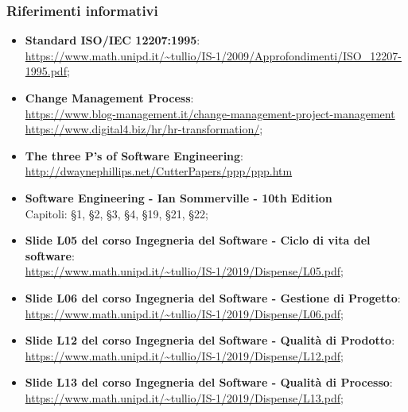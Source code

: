 \subsubsection{Riferimenti informativi}
\begin{itemize}
	\item \textbf{Standard ISO/IEC 12207:1995}: \\
	\url{https://www.math.unipd.it/~tullio/IS-1/2009/Approfondimenti/ISO_12207-1995.pdf};
	\item \textbf{Change Management Process}: \\
	\href{https://www.blog-management.it/2018/04/10/change-management-project-management/}{https://www.blog-management.it/change-management-project-management}\\
	\href{https://www.digital4.biz/hr/hr-transformation/digital-transformation-e-change-management-vanno-avanti-di-pari-passo/}{https://www.digital4.biz/hr/hr-transformation/};
	\item \textbf{The three P's of Software Engineering}: \\
	\url{http://dwaynephillips.net/CutterPapers/ppp/ppp.htm}
	\item \textbf{Software Engineering - Ian Sommerville - 10th Edition} \\
	Capitoli: \S 1, \S 2, \S 3, \S 4, \S 19, \S 21, \S 22;
	\item \textbf{Slide L05 del corso Ingegneria del Software - Ciclo di vita del software}: \\ 
	\url{https://www.math.unipd.it/~tullio/IS-1/2019/Dispense/L05.pdf};
	\item \textbf{Slide L06 del corso Ingegneria del Software - Gestione di Progetto}: \\
	\url{https://www.math.unipd.it/~tullio/IS-1/2019/Dispense/L06.pdf};	
	\item \textbf{Slide L12 del corso Ingegneria del Software - Qualità di Prodotto}: \\
	\url{https://www.math.unipd.it/~tullio/IS-1/2019/Dispense/L12.pdf};
	\item \textbf{Slide L13 del corso Ingegneria del Software - Qualità di Processo}: \\
	\url{https://www.math.unipd.it/~tullio/IS-1/2019/Dispense/L13.pdf};
\end{itemize}